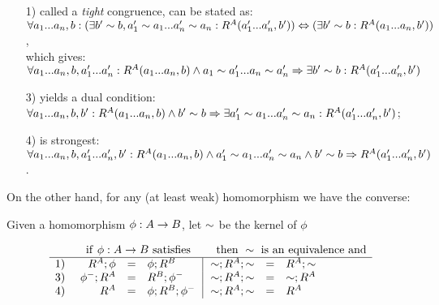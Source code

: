 \documentclass[10pt]{article}
\begin{document}
\begin{itemize}\MyLPar
\item[1)] called a {\em tight} congruence,
can be stated as: \\
$\forall a_{1}...a_{n},b: (\exists b'\sim b,a'_1\sim
a_1...a'_n\sim a_n:R^A(a'_{1}...a'_{n},b')) \Leftrightarrow (\exists b'\sim b: R^A(a_{1}...a_{n},b'))$,
\\ which gives: \\
$\forall a_{1}...a_{n},b, a'_{1}...a'_{n}: R^A(a_{1}...a_{n},b)\land a_1\sim a'_1...a_n\sim a'_n 
\Rightarrow \exists
b'\sim b:R^A(a'_{1}...a'_{n},b')$ 

\item[3)]
yields a dual condition: \\ $\forall a_{1}...a_{n}, b,b': R^A(a_{1}...a_{n},b) \land
b'\sim b \Rightarrow \exists a'_1\sim a_1...a'_n\sim a_n : R^A(a'_{1}...a'_{n},b')$;

\item[4)] 
is strongest: $\forall a_{1}...a_{n},b,a'_{1}...a'_{n},b': R^A(a_{1}...a_{n},b)\land
 a'_1\sim a_1...a'_n\sim a_n \land b'\sim b\Rightarrow R^A(a'_{1}...a'_{n},b')$. 
\end{itemize}
%
%
On the other hand, for any (at least weak) homomorphism we have the
converse:

\begin{Prop}\label{pro:congrev} 
Given a homomorphism $\phi:A\rightarrow B$, let $\sim$ be the kernel of
$\phi$

\[
\begin{array}{r@{\ \ \ \ }rcl@{\ \ }|@{\ \ }rcl}
& \multicolumn{3}{l}{{\rm if\ }\phi:A\into B{\rm\ satisfies}} & \multicolumn{3}{c}{{\rm then\ }\congo\ 
{\rm is\ an\ equivalence\ and} } \\ \hline
1) & R^A;\phi &=& \phi;R^B      & \congo;R^A;\congo & = & R^A;\congo   \\
3) & \phi^-;R^A &=& R^B;\phi^-  & \congo;R^A;\congo & = & \congo;R^A \\
4) & R^A &=& \phi;R^B;\phi^-    & \congo;R^A;\congo & = & R^A    
\end{array}
\]
\end{Prop}
\end{document}
